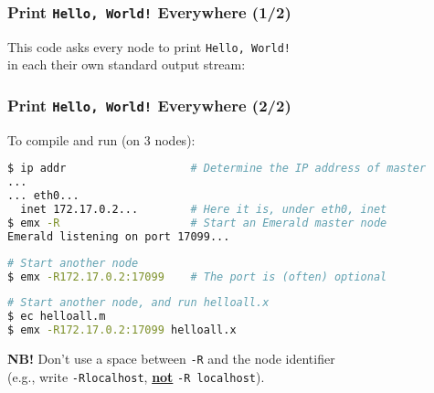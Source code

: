 \begin{frame}[fragile]

\frametitle{Print \texttt{Hello, World!} Everywhere (1/2)}

This code asks every node to print \texttt{Hello, World!}\\ in each
their own standard output stream:


\end{frame}

\begin{frame}[fragile]

\frametitle{Print \texttt{Hello, World!} Everywhere (2/2)}

To compile and run (on 3 nodes):

\begin{lstlisting}[language=bash]
$ ip addr                   # Determine the IP address of master
...
... eth0...
  inet 172.17.0.2...        # Here it is, under eth0, inet
$ emx -R                    # Start an Emerald master node
Emerald listening on port 17099...
\end{lstlisting}

\begin{lstlisting}[language=bash]
# Start another node
$ emx -R172.17.0.2:17099    # The port is (often) optional
\end{lstlisting}

\begin{lstlisting}[language=bash]
# Start another node, and run helloall.x
$ ec helloall.m             
$ emx -R172.17.0.2:17099 helloall.x
\end{lstlisting}

\textbf{NB!} Don't use a space between \texttt{-R} and the node
identifier\\ (e.g., write \texttt{-Rlocalhost},
\textbf{\underline{not}} \texttt{-R localhost}).

\end{frame}
